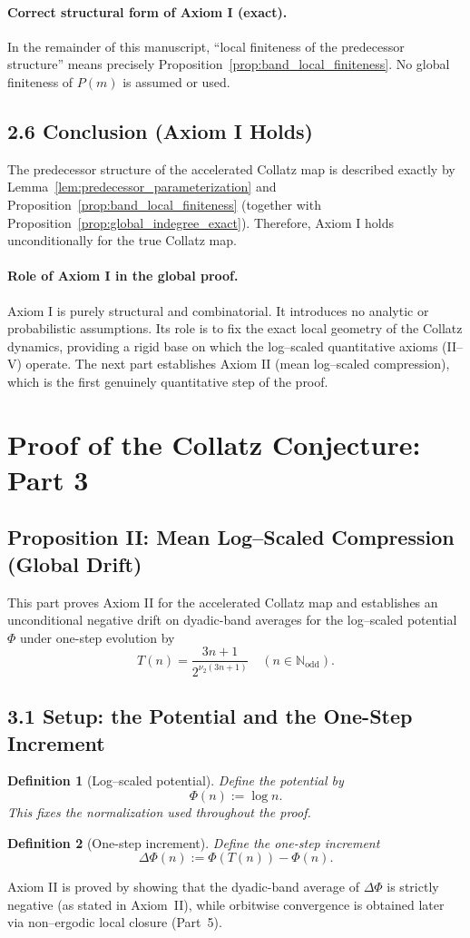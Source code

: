 \documentclass[preprint,12pt]{elsarticle}
\newtheorem{definition}{Definition}
\begin{document}
\paragraph{Correct structural form of Axiom I (exact).}
In the remainder of this manuscript, ``local finiteness of the predecessor structure'' means precisely
Proposition~\ref{prop:band_local_finiteness}. No global finiteness of $P(m)$ is assumed or used.

\subsection*{2.6 Conclusion (Axiom I Holds)}
The predecessor structure of the accelerated Collatz map is described exactly by Lemma~\ref{lem:predecessor_parameterization} and Proposition~\ref{prop:band_local_finiteness} (together with Proposition~\ref{prop:global_indegree_exact}).
Therefore, Axiom I holds unconditionally for the true Collatz map.

\paragraph{Role of Axiom I in the global proof.}
Axiom I is purely structural and combinatorial. It introduces no analytic or probabilistic assumptions. Its role is to fix the exact local geometry of the Collatz dynamics, providing a rigid base on which the log–scaled quantitative axioms (II–V) operate.
The next part establishes Axiom II (mean log–scaled compression), which is the first genuinely quantitative step of the proof.
\section{Proof of the Collatz Conjecture: Part 3}
\subsection{Proposition II: Mean Log--Scaled Compression (Global Drift)}
This part proves Axiom II for the accelerated Collatz map and establishes an unconditional negative drift on dyadic-band averages for the log–scaled potential \(\Phi\) under one-step evolution by
\[
T(n)=\frac{3n+1}{2^{\nu_2(3n+1)}}
\quad (n\in\mathbb{N}_{\mathrm{odd}}).
\]

\subsection{3.1 Setup: the Potential and the One-Step Increment}
\begin{definition}[Log--scaled potential]
Define the potential by
\[
\Phi(n) := \log n.
\]
This fixes the normalization used throughout the proof.
\end{definition}
\begin{definition}[One-step increment]
Define the one-step increment
\[
\Delta\Phi(n) := \Phi(T(n)) - \Phi(n).
\]
\end{definition}
Axiom II is proved by showing that the dyadic-band average of \(\Delta\Phi\) is strictly negative (as stated in Axiom~II), while orbitwise convergence is obtained later via non--ergodic local closure (Part~5).
\end{document}
